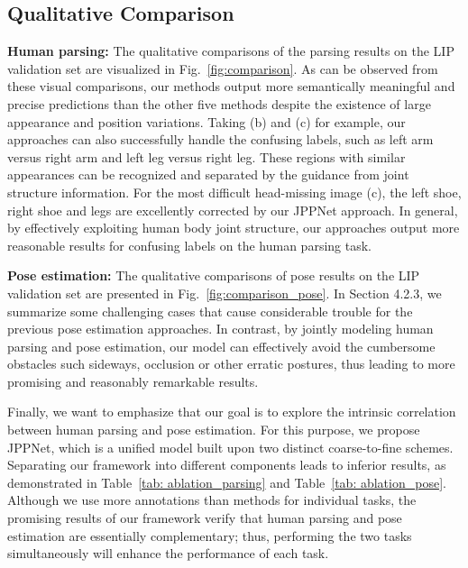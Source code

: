 \documentclass[10pt,journal,compsoc]{IEEEtran}
\begin{document}
\subsection{Qualitative Comparison}
\textbf{Human parsing:}
The qualitative comparisons of the parsing results on the LIP validation set are visualized in Fig.~\ref{fig:comparison}. As can be observed from these visual comparisons, our methods output more semantically meaningful and precise predictions than the other five methods despite the existence of large appearance and position variations. Taking (b) and (c) for example, our approaches can also successfully handle the confusing labels, such as left arm versus right arm and left leg versus right leg. These regions with similar appearances can be recognized and separated by the guidance from joint structure information. For the most difficult head-missing image (c), the left shoe, right shoe and legs are excellently corrected by our JPPNet approach. In general, by effectively exploiting human body joint structure, our approaches output more reasonable results for confusing labels on the human parsing task.

\textbf{Pose estimation:}
The qualitative comparisons of pose results on the LIP validation set are presented in Fig.~\ref{fig:comparison_pose}. In Section 4.2.3, we summarize some challenging cases that cause considerable trouble for the previous pose estimation approaches. In contrast, by jointly modeling human parsing and pose estimation, our model can effectively avoid the cumbersome obstacles such sideways, occlusion or other erratic postures, thus leading to more promising and reasonably remarkable results.

Finally, we want to emphasize that our goal is to explore the intrinsic correlation between human parsing and pose estimation. For this purpose, we propose JPPNet, which is a unified model built upon two distinct coarse-to-fine schemes. Separating our framework into different components leads to inferior results, as demonstrated in Table~\ref{tab: ablation_parsing} and Table~\ref{tab: ablation_pose}. Although we use more annotations than methods for individual tasks, the promising results of our framework verify that human parsing and pose estimation are essentially complementary; thus, performing the two tasks simultaneously will enhance the performance of each task.
\end{document}

